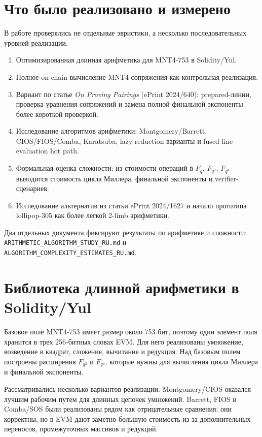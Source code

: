 \documentclass[12pt,a4paper]{article}
\newcommand{\code}[1]{\texttt{#1}}
\begin{document}
\section{Что было реализовано и измерено}

В работе проверялись не отдельные эвристики, а несколько последовательных уровней реализации.

\begin{enumerate}
    \item Оптимизированная длинная арифметика для MNT4-753 в Solidity/Yul.
    \item Полное on-chain вычисление MNT4-сопряжения как контрольная реализация.
    \item Вариант по статье \emph{On Proving Pairings} (ePrint 2024/640): prepared-линии, проверка уравнения сопряжений и замена полной финальной экспоненты более короткой проверкой.
    \item Исследование алгоритмов арифметики: Montgomery/Barrett, CIOS/FIOS/Comba, Karatsuba, lazy-reduction варианты и fused line-evaluation hot path.
    \item Формальная оценка сложности: из стоимости операций в \(F_q\), \(F_{q^2}\), \(F_{q^4}\) выводится стоимость цикла Миллера, финальной экспоненты и verifier-сценариев.
    \item Исследование альтернатив из статьи ePrint 2024/1627 и начало прототипа lollipop-305 как более легкой 2-limb арифметики.
\end{enumerate}

Два отдельных документа фиксируют результаты по арифметике и сложности: \code{ARITHMETIC\_ALGORITHM\_STUDY\_RU.md} и \code{ALGORITHM\_COMPLEXITY\_ESTIMATES\_RU.md}.

\section{Библиотека длинной арифметики в Solidity/Yul}

Базовое поле MNT4-753 имеет размер около 753 бит, поэтому один элемент поля хранится в трех 256-битных словах EVM. Для него реализованы умножение, возведение в квадрат, сложение, вычитание и редукция. Над базовым полем построены расширения \(F_{q^2}\) и \(F_{q^4}\), которые нужны для вычисления цикла Миллера и финальной экспоненты.

Рассматривались несколько вариантов реализации. Montgomery/CIOS оказался лучшим рабочим путем для длинных цепочек умножений. Barrett, FIOS и Comba/SOS были реализованы рядом как отрицательные сравнения: они корректны, но в EVM дают заметно большую стоимость из-за дополнительных переносов, промежуточных массивов и редукций.
\end{document}
